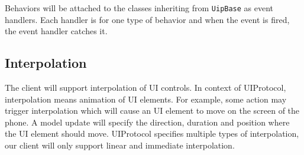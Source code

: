 Behaviors will be attached to the classes inheriting from \texttt{UipBase} as event handlers. Each handler is for one type of behavior and when the event is fired, the event handler catches it.

\subsection{Interpolation}
The client will support interpolation of UI controls. In context of UIProtocol, interpolation means animation of UI elements. For example, some action may trigger interpolation which will cause an UI element to move on the screen of the phone. A model update will specify the direction, duration and position where the UI element should move. UIProtocol specifies multiple types of interpolation, our client will only support linear and immediate interpolation.



